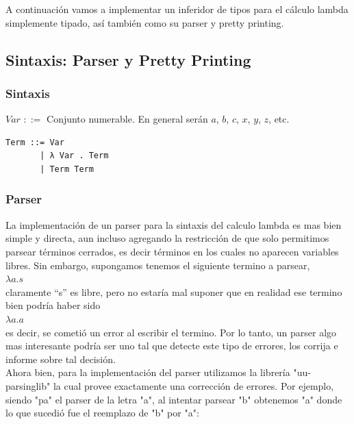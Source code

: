 \documentclass[a4paper,10pt]{article}
\begin{document}
A continuación vamos a implementar un inferidor de tipos para el cálculo lambda 
simplemente tipado, así también como su parser y pretty printing.

\subsection{Sintaxis: Parser y Pretty Printing}

\subsubsection{Sintaxis}

$Var$ $::=$ Conjunto numerable. En general serán $a$, $b$, $c$, $x$, $y$, $z$, etc.


\begin{lstlisting}
Term ::= Var
       | λ Var . Term
       | Term Term
\end{lstlisting}


\subsubsection{Parser}

La implementación de un parser para la sintaxis del calculo lambda es mas bien
simple y directa, aun incluso agregando la restricción de que solo permitimos parsear
términos cerrados, es decir términos en los cuales no aparecen variables libres.
Sin embargo, supongamos tenemos el siguiente termino a parsear,\\

$\lambda a . s$\\

claramente ``s'' es libre, pero no estaría mal suponer que en realidad ese termino
bien podría haber sido\\

$\lambda a . a$\\

es decir, se cometió un error al escribir el termino. Por lo tanto, un parser
algo mas interesante podría ser uno tal que detecte este tipo de errores, los
corrija e informe sobre tal decisión.\\

Ahora bien, para la implementación del parser utilizamos la librería "uu-parsinglib"
la cual provee exactamente una corrección de errores. Por ejemplo, siendo "pa"
el parser de la letra "a", al intentar parsear "b" obtenemos "a" donde lo que
sucedió fue el reemplazo de "b" por "a":\\
\end{document}
